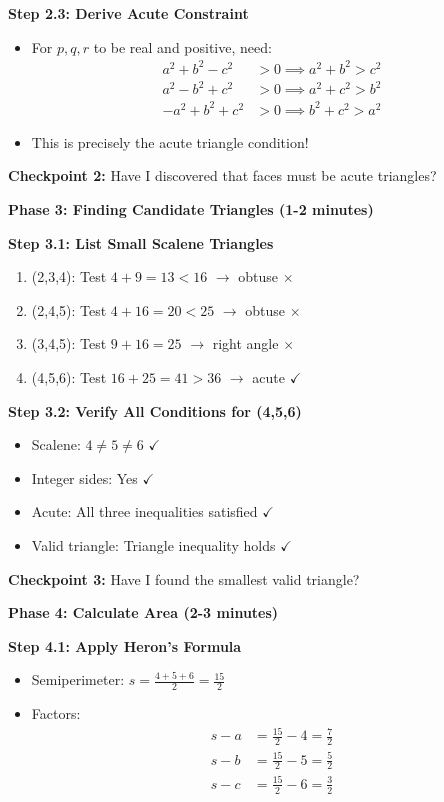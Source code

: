 \documentclass[12pt]{article}
\begin{document}
\begin{solutionbox}
\textbf{Step 2.3: Derive Acute Constraint}
\begin{itemize}
    \item For $p, q, r$ to be real and positive, need:
    \begin{align*}
    a^2 + b^2 - c^2 &> 0 \implies a^2 + b^2 > c^2 \\
    a^2 - b^2 + c^2 &> 0 \implies a^2 + c^2 > b^2 \\
    -a^2 + b^2 + c^2 &> 0 \implies b^2 + c^2 > a^2
    \end{align*}
    \item This is precisely the acute triangle condition!
\end{itemize}

\textbf{Checkpoint 2:} Have I discovered that faces must be acute triangles?

\textbf{Phase 3: Finding Candidate Triangles (1-2 minutes)}

\textbf{Step 3.1: List Small Scalene Triangles}
\begin{enumerate}
    \item (2,3,4): Test $4 + 9 = 13 < 16$ $\to$ obtuse $\times$
    \item (2,4,5): Test $4 + 16 = 20 < 25$ $\to$ obtuse $\times$
    \item (3,4,5): Test $9 + 16 = 25$ $\to$ right angle $\times$
    \item (4,5,6): Test $16 + 25 = 41 > 36$ $\to$ acute $\checkmark$
\end{enumerate}

\textbf{Step 3.2: Verify All Conditions for (4,5,6)}
\begin{itemize}
    \item Scalene: $4 \neq 5 \neq 6$ $\checkmark$
    \item Integer sides: Yes $\checkmark$
    \item Acute: All three inequalities satisfied $\checkmark$
    \item Valid triangle: Triangle inequality holds $\checkmark$
\end{itemize}

\textbf{Checkpoint 3:} Have I found the smallest valid triangle?

\textbf{Phase 4: Calculate Area (2-3 minutes)}

\textbf{Step 4.1: Apply Heron's Formula}
\begin{itemize}
    \item Semiperimeter: $s = \frac{4+5+6}{2} = \frac{15}{2}$
    \item Factors:
    \begin{align*}
    s - a &= \frac{15}{2} - 4 = \frac{7}{2} \\
    s - b &= \frac{15}{2} - 5 = \frac{5}{2} \\
    s - c &= \frac{15}{2} - 6 = \frac{3}{2}
    \end{align*}
\end{itemize}


\end{solutionbox}
\end{document}
